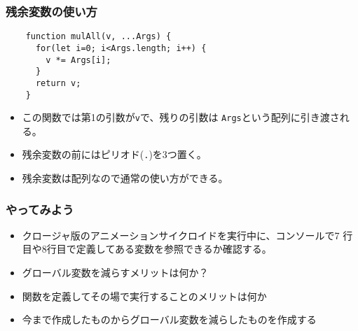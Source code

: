 \begin{frame}[containsverbatim]
 \frametitle{残余変数の使い方}
	\begin{Verbatim}
	function mulAll(v, ...Args) {
	  for(let i=0; i<Args.length; i++) {
	    v *= Args[i];
	  }
	  return v;
	}
	\end{Verbatim}
\begin{itemize}
 \item この関数では第1の引数が\texttt{v}で、残りの引数は
			 \texttt{Args}という配列に引き渡される。
 \item 残余変数の前にはピリオド(\texttt{.})を3つ置く。
 \item 残余変数は配列なので通常の使い方ができる。
 \end{itemize}
\end{frame}
\begin{frame}[containsverbatim]
 \frametitle{やってみよう}
 \begin{itemize}
	\item クロージャ版のアニメーションサイクロイドを実行中に、コンソールで7
				行目や8行目で定義してある変数を参照できるか確認する。
	\item グローバル変数を減らすメリットは何か？
	\item 関数を定義してその場で実行することのメリットは何か
	\item 今まで作成したものからグローバル変数を減らしたものを作成する
 \end{itemize}
\end{frame}


\begin{frame}[containsverbatim]
 \frametitle{}
\end{frame}
